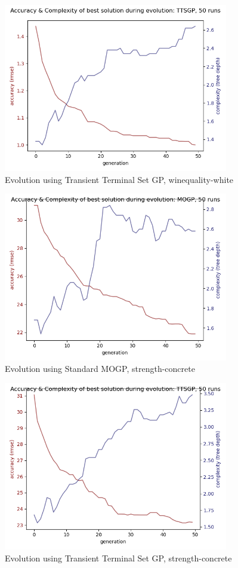 \documentclass[a4paper]{article}
\begin{document}
\begin{figure}[H]
	\caption{Evolution using Transient Terminal Set GP, winequality-white}
	\centering
	\includegraphics[width=0.875\textwidth]{winequality-white-evo-TTSGP}
\end{figure}
\begin{figure}[H]
	\caption{Evolution using Standard MOGP, strength-concrete}
	\centering
	\includegraphics[width=0.875\textwidth]{strength-concrete-evo-MOGP}
\end{figure}
\begin{figure}[H]
	\caption{Evolution using Transient Terminal Set GP, strength-concrete}
	\centering
	\includegraphics[width=0.875\textwidth]{strength-concrete-evo-TTSGP}
\end{figure}
\end{document}
